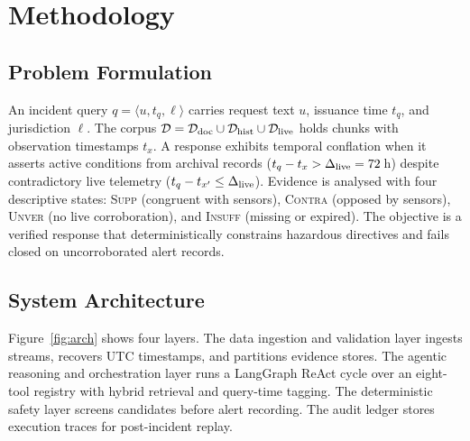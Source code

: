 \documentclass[conference]{IEEEtran}
\begin{document}
\section{Methodology}
\subsection{Problem Formulation}
An incident query $q=\langle u,t_q,\ell\rangle$ carries request text $u$, issuance time $t_q$, and jurisdiction $\ell$. The corpus $\mathcal{D}=\mathcal{D}_{\rm doc}\cup\mathcal{D}_{\rm hist}\cup\mathcal{D}_{\rm live}$ holds chunks with observation timestamps $t_x$. A response exhibits temporal conflation when it asserts active conditions from archival records ($t_q-t_x>\Delta_{\rm live}=72$\,h) despite contradictory live telemetry ($t_q-t_{x'}\le\Delta_{\rm live}$). Evidence is analysed with four descriptive states: \textsc{Supp} (congruent with sensors), \textsc{Contra} (opposed by sensors), \textsc{Unver} (no live corroboration), and \textsc{Insuff} (missing or expired). The objective is a verified response that deterministically constrains hazardous directives and fails closed on uncorroborated alert records.

\subsection{System Architecture}
Figure~\ref{fig:arch} shows four layers. The data ingestion and validation layer ingests streams, recovers UTC timestamps, and partitions evidence stores. The agentic reasoning and orchestration layer runs a LangGraph ReAct cycle over an eight-tool registry with hybrid retrieval and query-time tagging. The deterministic safety layer screens candidates before alert recording. The audit ledger stores execution traces for post-incident replay.
\end{document}
